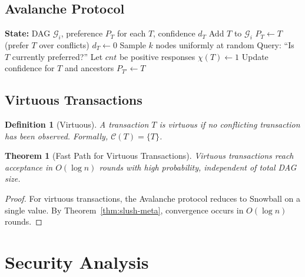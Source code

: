 \documentclass[11pt,a4paper]{article}
\newtheorem{theorem}{Theorem}
\newtheorem{definition}{Definition}
\begin{document}
\subsection{Avalanche Protocol}

\begin{algorithm}
\caption{Avalanche Protocol for Node $i$}
\begin{algorithmic}[1]
\STATE \textbf{State:} DAG $\mathcal{G}_i$, preference $P_T$ for each $T$, confidence $d_T$
        \STATE Add $T$ to $\mathcal{G}_i$
        \STATE $P_T \gets T$ (prefer $T$ over conflicts)
        \STATE $d_T \gets 0$
    \ENDIF
\ENDPROCEDURE
{}
    \STATE Sample $k$ nodes uniformly at random
    \STATE Query: ``Is $T$ currently preferred?''
    \STATE Let $cnt$ be positive responses
        \STATE $\chi(T) \gets 1$ 
        \STATE Update confidence for $T$ and ancestors
                \STATE $P_{T'} \gets T$ 
            \ENDIF
        \ENDFOR
    \ENDIF
\ENDPROCEDURE
\end{algorithmic}
\end{algorithm}

\subsection{Virtuous Transactions}

\begin{definition}[Virtuous]
A transaction $T$ is virtuous if no conflicting transaction has been observed. Formally, $\mathcal{C}(T) = \{T\}$.
\end{definition}

\begin{theorem}[Fast Path for Virtuous Transactions]
\label{thm:virtuous-fast}
Virtuous transactions reach acceptance in $O(\log n)$ rounds with high probability, independent of total DAG size.
\end{theorem}

\begin{proof}
For virtuous transactions, the Avalanche protocol reduces to Snowball on a single value. By Theorem~\ref{thm:slush-meta}, convergence occurs in $O(\log n)$ rounds.
\end{proof}

\section{Security Analysis}
\end{document}
